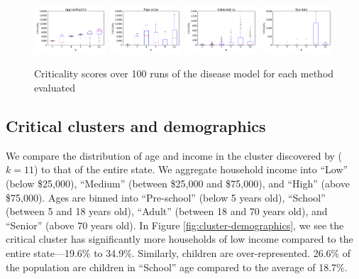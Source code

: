 \begin{figure}
\centering
\includegraphics[width=0.24\textwidth]{img/mn_criticality_cluster_boxplot.pdf}
\includegraphics[width=0.24\textwidth]{img/mn_popsize_cluster_boxplot.pdf}
\includegraphics[width=0.24\textwidth]{img/mn_avg_blkgrp_cluster_boxplot.pdf}
\includegraphics[width=0.24\textwidth]{img/mn_random_blkgrp_cluster_boxplot.pdf}\\
\caption{Criticality scores over 100 runs of the disease model for each method evaluated}
\label{fig:crit-boxplots}
\end{figure}

\subsection{Critical clusters and demographics}
\label{sec:demographics}
We compare the distribution of age and income in the cluster discovered by \algomaxcrit{} ($k=11$) to that of the entire state. We aggregate household income into ``Low'' (below \$25,000), ``Medium'' (between \$25,000 and \$75,000), and ``High'' (above \$75,000). Ages are binned into ``Pre-school'' (below 5 years old), ``School'' (between 5 and 18 years old), ``Adult'' (between 18 and 70 years old), and ``Senior'' (above 70 years old). In Figure \ref{fig:cluster-demographics}, we see the critical cluster has significantly more households of low income compared to the entire state---19.6\% to 34.9\%. Similarly, children are over-represented. 26.6\% of the population are children in ``School'' age compared to the average of 18.7\%.

